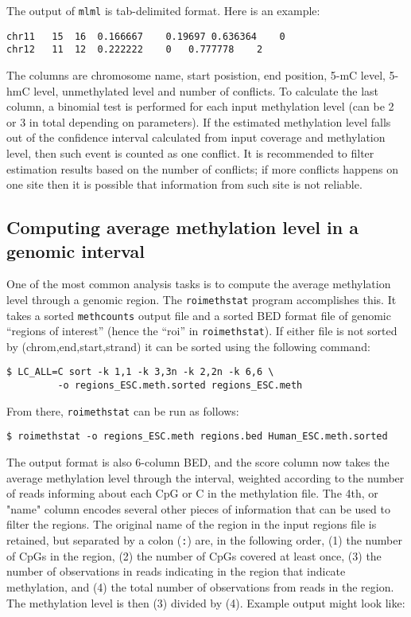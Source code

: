 \documentclass[10pt]{article}
\newcommand{\prog}[1]{\texttt{#1}}
\newcommand{\lit}[1]{\texttt{#1}}
\begin{document}
{{The output of \prog{mlml} is tab-delimited format. Here is an example:
\begin{verbatim}
chr11	15	16	0.166667	0.19697	0.636364	0 
chr12	11	12	0.222222	0	0.777778	2
\end{verbatim}
The columns are chromosome name, start posistion, end position, 5-mC level, 
5-hmC level, unmethylated level and number of conflicts. To calculate the last
column, a binomial test is performed for each input methylation level 
(can be 2 or 3 in total depending on parameters). If the estimated 
methylation level falls out of the confidence interval calculated from 
input coverage and methylation level, then such event is counted as one 
conflict. It is recommended to filter estimation results based on the number 
of conflicts; if more conflicts happens on one site then it is possible 
that information from such site is not reliable.

\subsection{Computing average methylation level in a genomic interval}
\label{sec:roimethstat}

One of the most common analysis tasks is to compute the average
methylation level through a genomic region. The \prog{roimethstat}
program accomplishes this. It takes a sorted \prog{methcounts} output
file and a sorted BED format file of genomic ``regions of interest''
(hence the ``roi'' in \prog{roimethstat}).  If either file is not
sorted by (chrom,end,start,strand) it can be sorted using the
following command:

\begin{verbatim}
$ LC_ALL=C sort -k 1,1 -k 3,3n -k 2,2n -k 6,6 \
         -o regions_ESC.meth.sorted regions_ESC.meth
\end{verbatim}

From there, \prog{roimethstat} can be run as follows:

\begin{verbatim}
$ roimethstat -o regions_ESC.meth regions.bed Human_ESC.meth.sorted
\end{verbatim}

The output format is also 6-column BED, and the score column now takes
the average methylation level through the interval, weighted according
to the number of reads informing about each CpG or C in the
methylation file. The 4th, or "name" column encodes several other
pieces of information that can be used to filter the regions. The
original name of the region in the input regions file is retained, but
separated by a colon (\lit{:}) are, in the following order, (1) the
number of CpGs in the region, (2) the number of CpGs covered at least
once, (3) the number of observations in reads indicating in the region
that indicate methylation, and (4) the total number of observations
from reads in the region. The methylation level is then (3) divided by
(4). Example output might look like:

}}
\end{document}
